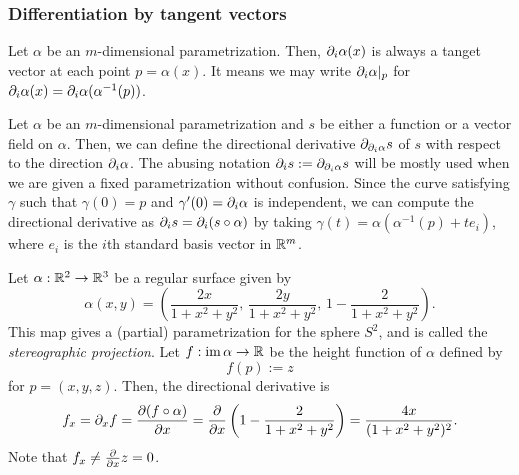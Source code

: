 \documentclass{../exp}
\def\a{\alpha}
\begin{document}

\subsubsection{Differentiation by tangent vectors}



\begin{ex}
Let $\a$ be an $m$-dimensional parametrization.
Then, $\pd_i\a(x)$ is always a tanget vector at each point $p=\a(x)$.
It means we may write $\pd_i\a|_p$ for $\pd_i\a(x)=\pd_i\a(\a^{-1}(p))$.
\end{ex}



\begin{ex}
Let $\a$ be an $m$-dimensional parametrization and $s$ be either a function or a vector field on $\a$.
Then, we can define the directional derivative $\pd_{\pd_i\a}s$ of $s$ with respect to the direction $\pd_i\a$.
The abusing notation $\pd_is:=\pd_{\pd_i\a}s$ will be mostly used when we are given a fixed parametrization without confusion.
Since the curve satisfying $\gamma$ such that $\gamma(0)=p$ and $\gamma'(0)=\pd_i\a$ is independent, we can compute the directional derivative as $\pd_is=\pd_i(s\o\a)$ by taking $\gamma(t)=\a(\a^{-1}(p)+te_i)$, where $e_i$ is the $i$th standard basis vector in $\mathbb{R}^m$.
\end{ex}

\begin{ex}
Let $\a:\R^2\to\R^3$ be a regular surface given by
\[\a(x,y)=\left(\frac{2x}{1+x^2+y^2},\,\frac{2y}{1+x^2+y^2},\,1-\frac2{1+x^2+y^2}\right).\]
This map gives a (partial) parametrization for the sphere $S^2$, and is called the \emph{stereographic projection}.
Let $f:\im\a\to\R$ be the height function of $\a$ defined by
\[f(p):=z\]
for $p=(x,y,z)$.
Then, the directional derivative is
\[f_x=\pd_xf=\pd{(f\o\a)}{x}=\pd{x}\left(1-\frac2{1+x^2+y^2}\right)=\frac{4x}{(1+x^2+y^2)^2}.\]
Note that $f_x\ne\pd{x}z=0$.
\end{ex}

\end{document}
